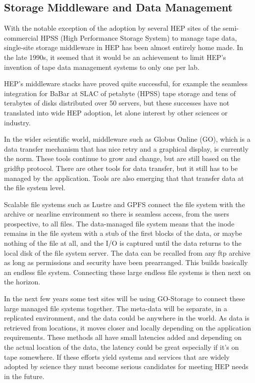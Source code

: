 \subsection{Storage Middleware and Data Management}
With the notable exception of the adoption by several HEP sites of the 
semi-commercial HPSS (High Performance Storage System)\cite{HPSS:url} to manage tape data, 
single-site storage middleware in HEP has been almost entirely home made.  In the 
late 1990s, it seemed that it would be an achievement to limit HEP's invention 
of tape data management systems to only one per lab.

HEP's middleware stacks have proved quite successful, for example the seamless 
integration for BaBar at SLAC of petabyte (HPSS) tape storage and tens of terabytes 
of disks distributed over 50 servers, but these successes have not translated into 
wide HEP adoption, let alone interest by other sciences or industry. 

In the wider scientific world, middleware such as Globus Online (GO)\cite{GlobusOnline:url}, which is 
a data transfer mechanism that has nice retry and a graphical display, is 
currently the norm.  These tools continue to grow and change, but are still 
based on the gridftp protocol.  There are other tools for data transfer, but 
it still has to be managed by the application.  Tools are also emerging that 
that transfer data at the file system level.  

Scalable file systems such as Lustre\cite{Lustre:url} and GPFS\cite{GPFS:url} connect 
the file system with the archive or nearline environment so there is seamless
access, from the users prospective, to all files.  The data-managed file 
system means that the inode remains in the file system with a stub of the first 
blocks of the data, or maybe nothing of the file at all, and the I/O is captured 
until the data returns to the local disk of the file system server.   
The data can be recalled from any ftp archive as long as permissions and 
security have been prearranged.   This builds basically an endless file system.   
Connecting these large endless file systems is then next on the horizon.  

In the next few years some test sites will be using GO-Storage 
to connect these large managed file systems together. The meta-data will be 
separate, in a replicated environment, and the data could be anywhere in the 
world.  As data is retrieved from locations, it moves closer and locally 
depending on the application requirements.   These methods all have small 
latencies added and depending on the actual location of the data, the latency could 
be great especially if it's on tape somewhere.   If these efforts yield systems and services 
that are widely adopted by science they must become serious candidates for 
meeting HEP needs in the future.

